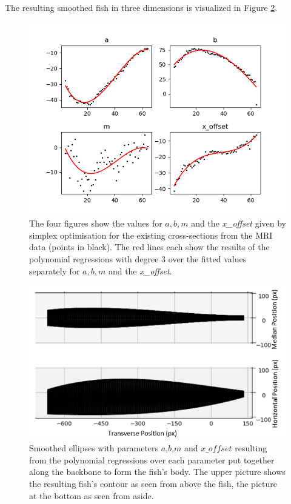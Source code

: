 The resulting smoothed fish in three dimensions is visualized in Figure \ref{fig:ell_regression}.

\begin{figure}
\centering
\includegraphics[width = 1\linewidth]{figures/param_regressions.png}
\caption{The four figures show the values for $a,b,m$ and the \textit{x\_offset} given by simplex optimisation for the existing cross-sections from the MRI data (points in black). The red lines each show the results of the polynomial regressions with degree 3 over the fitted values separately for $a,b,m$ and the \textit{x\_offset}.}
\label{fig:paramreg}
\end{figure}

\begin{figure}
\centering
\includegraphics[width = 1\linewidth]{figures/Ellipsis_regression.png}
\caption{Smoothed ellipses with parameters $a$,$b$,$m$ and  $x\_offset$ resulting from the polynomial regressions over each parameter put together along the backbone to form the fish's body. The upper picture shows the resulting fish's contour as seen from above the fish, the picture at the bottom as seen from aside.}
\label{fig:ell_regression}
\end{figure}


